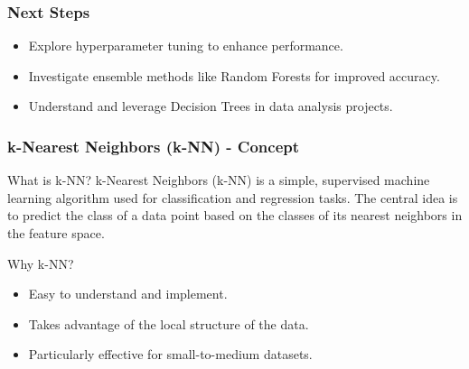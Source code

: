 \documentclass[aspectratio=169]{beamer}
\begin{document}
\begin{frame}
    \frametitle{Next Steps}
    \begin{itemize}
        \item Explore hyperparameter tuning to enhance performance.
        \item Investigate ensemble methods like Random Forests for improved accuracy.
        \item Understand and leverage Decision Trees in data analysis projects.
    \end{itemize}
\end{frame}

\begin{frame}[fragile]
    \frametitle{k-Nearest Neighbors (k-NN) - Concept}
    \begin{block}{What is k-NN?}
        k-Nearest Neighbors (k-NN) is a simple, supervised machine learning algorithm used for classification and regression tasks. 
        The central idea is to predict the class of a data point based on the classes of its nearest neighbors in the feature space.
    \end{block}
    
    \begin{block}{Why k-NN?}
        \begin{itemize}
            \item Easy to understand and implement.
            \item Takes advantage of the local structure of the data.
            \item Particularly effective for small-to-medium datasets.
        \end{itemize}
    \end{block}
\end{frame}
\end{document}
